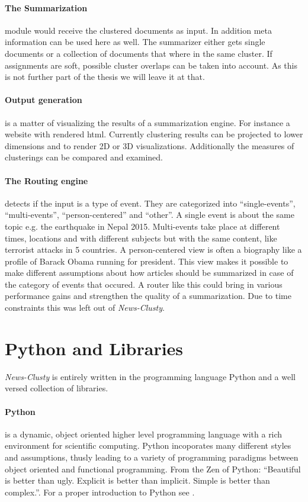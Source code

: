   \paragraph{The Summarization} module would receive the clustered documents as input. In addition meta information can be used here as well. The summarizer either gets single documents or a collection of documents that where in the same cluster. If assignments are soft, possible cluster overlaps can be taken into account. As this is not further part of the thesis we will leave it at that.

  \paragraph{Output generation} is a matter of visualizing the results of a summarization engine. For instance a website with rendered html. Currently clustering results can be projected to lower dimensions and to render 2D or 3D visualizations. Additionally the measures of clusterings can be compared and examined.

  \paragraph{The Routing engine} detects if the input is a type of event. They are categorized into ``single-events'', ``multi-events'', ``person-centered'' and ``other''. A single event is about the same topic e.g. the earthquake in Nepal 2015. Multi-events take place at different times, locations and with different subjects but with the same content, like terrorist attacks in 5 countries. A person-centered view is often a biography like a profile of Barack Obama running for president. This view makes it possible to make different assumptions about how articles should be summarized in case of the category of events that occured. A router like this could bring in various performance gains and strengthen the quality of a summarization. Due to time constraints this was left out of \emph{News-Clusty}.

\section{Python and Libraries}
  \emph{News-Clusty} is entirely written in the programming language Python and a well versed collection of libraries.

  \paragraph{Python} is a dynamic, object oriented higher level programming language with a rich environment for scientific computing. Python incoporates many different styles and assumptions, thusly leading to a variety of programming paradigms between object oriented and functional programming. From the Zen of Python: ``Beautiful is better than ugly. Explicit is better than implicit. Simple is better than complex.''. For a proper introduction to Python see \cite{NltkPython}.

